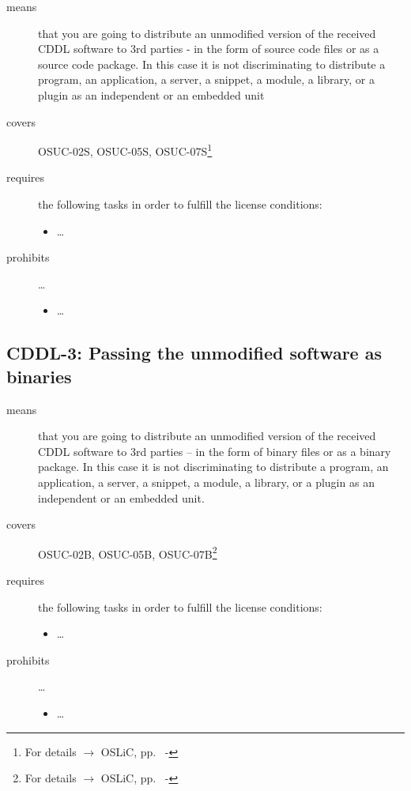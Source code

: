 \begin{description}

\item[means] that you are going to distribute an unmodified version of the
received CDDL software to 3rd parties - in the form of source code files or as a
source code package. In this case it is not discriminating to distribute a
program, an application, a server, a snippet, a module, a library, or a plugin
as an independent or an embedded unit

\item[covers] OSUC-02S, OSUC-05S, OSUC-07S\footnote{For details $\rightarrow$
OSLiC, pp.\ \pageref{OSUC-02S-DEF} - \pageref{OSUC-07S-DEF}}

\item[requires] the following tasks in order to fulfill the license conditions:
\begin{itemize}
  
  \item \ldots
  
\end{itemize}

\item[prohibits] \ldots
\begin{itemize}
  \item \ldots
\end{itemize}
\end{description}


\subsection{CDDL-3: Passing the unmodified software as binaries} 
\label{OSUC-02B-CDDL} \label{OSUC-05B-CDDL} \label{OSUC-07B-CDDL}

\begin{description}
\item[means] that you are going to distribute an unmodified version of the
received CDDL software to 3rd parties -- in the form of binary files or as a
bi\-na\-ry package. In this case it is not discriminating to distribute a
program, an application, a server, a snippet, a module, a library, or a plugin
as an independent or an embedded unit.

\item[covers] OSUC-02B, OSUC-05B, OSUC-07B\footnote{For details $\rightarrow$
OSLiC, pp.\ \pageref{OSUC-02B-DEF} - \pageref{OSUC-07B-DEF}}

\item[requires] the following tasks in order to fulfill the license conditions:
\begin{itemize}
  
  \item \ldots
  
\end{itemize}

\item[prohibits] \ldots
\begin{itemize}
  \item \ldots
\end{itemize}
\end{description}


